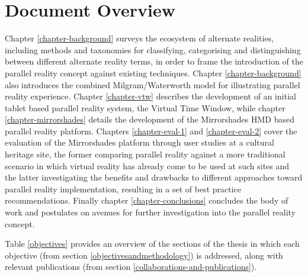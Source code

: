 
\section{Document Overview}

Chapter \ref{chapter-background} surveys the ecosystem of alternate realities, including methods and taxonomies for classifying, categorising and distinguishing between different alternate reality terms, in order to frame the introduction of the parallel reality concept against existing techniques. Chapter \ref{chapter-background} also introduces the combined Milgram/Waterworth model for illustrating parallel reality experience. Chapter \ref{chapter-vtw} describes the development of an initial tablet based parallel reality system, the Virtual Time Window, while chapter \ref{chapter-mirrorshades} details the development of the Mirrorshades HMD based parallel reality platform. Chapters \ref{chapter-eval-1} and \ref{chapter-eval-2} cover the evaluation of the Mirrorshades platform through user studies at a cultural heritage site, the former comparing parallel reality against a more traditional scenario in which virtual reality has already come to be used at such sites and the latter investigating the benefits and drawbacks to different approaches toward parallel reality implementation, resulting in a set of best practice recommendations. Finally chapter \ref{chapter-conclusions} concludes the body of work and postulates on avenues for further investigation into the parallel reality concept.

Table \ref{objectives} provides an overview of the sections of the thesis in which each objective (from section \ref{objectivesandmethodology}) is addressed, along with relevant publications (from section \ref{collaborations-and-publications}).

\vspace{5mm}

